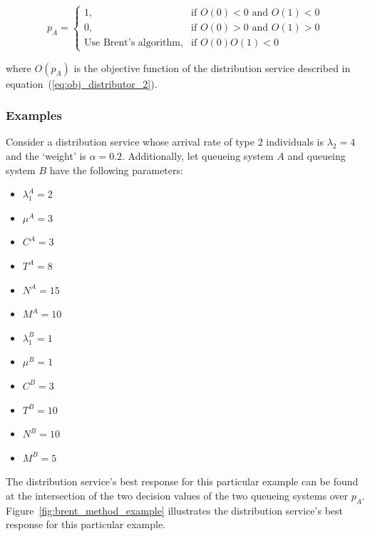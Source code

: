 \begin{equation}\label{eq:obj_distributor_implementation}
    p_A = \begin{cases}
        1, & \text{if } O(0) < 0 \text{ and } O(1) < 0 \\
        0, & \text{if } O(0) > 0 \text{ and } O(1) > 0 \\
        \text{Use Brent's algorithm}, & \text{if } O(0)O(1) < 0
    \end{cases}
\end{equation}

where \(O(p_A)\) is the objective function of the distribution service described
in equation~(\ref{eq:obj_distributor_2}).

\subsubsection{Examples}\label{sec:brent_method_example}
Consider a distribution service whose arrival rate of type 2 individuals is
\(\lambda_2 = 4\) and the `weight' is \(\alpha = 0.2\).
Additionally, let queueing system \(A\) and queueing system \(B\) have the
following parameters:

\begin{multicols}{2}
    \begin{itemize}
        \item \(\lambda_1^A = 2\)
        \item \(\mu^A = 3\)
        \item \(C^A = 3\)
        \item \(T^A = 8\)
        \item \(N^A = 15\)
        \item \(M^A = 10\)
        \item \(\lambda_1^B = 1\)
        \item \(\mu^B = 1\)
        \item \(C^B = 3\)
        \item \(T^B = 10\)
        \item \(N^B = 10\)
        \item \(M^B = 5\)
    \end{itemize}
\end{multicols}

The distribution service's best response for this particular example can be
found at the intersection of the two decision values of the two queueing
systems over \(p_A\).
Figure~\ref{fig:brent_method_example} illustrates the distribution service's
best response for this particular example.

